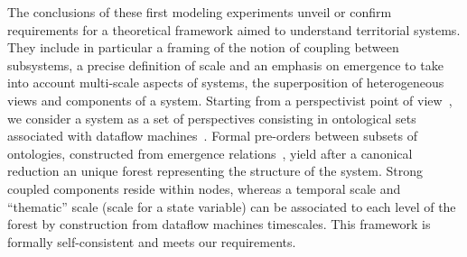 The conclusions of these first modeling experiments unveil or confirm requirements for a theoretical framework aimed to understand territorial systems. They include in particular a framing of the notion of coupling between subsystems, a precise definition of scale and an emphasis on emergence to take into account multi-scale aspects of systems, the superposition of heterogeneous views and components of a system. Starting from a perspectivist point of view~\cite{giere2010scientific}, we consider a system as a set of perspectives consisting in ontological sets~\cite{livet2010} associated with dataflow machines~\cite{golden2012modeling}. Formal pre-orders between subsets of ontologies, constructed from emergence relations~\cite{bedau2002downward}, yield after a canonical reduction an unique forest representing the structure of the system. Strong coupled components reside within nodes, whereas a temporal scale and ``thematic'' scale (scale for a state variable) can be associated to each level of the forest by construction from dataflow machines timescales. This framework is formally self-consistent and meets our requirements.





\tiny

\begin{multicols}{2}






\end{multicols}


